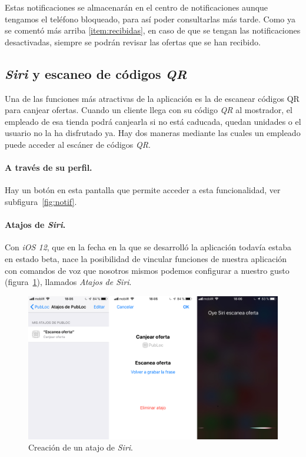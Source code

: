 Estas notificaciones se almacenarán en el centro de notificaciones aunque tengamos el teléfono bloqueado, para así poder consultarlas más tarde. Como ya se comentó más arriba \ref{item:recibidas}, en caso de que se tengan las notificaciones desactivadas, siempre se podrán revisar las ofertas que se han recibido.



\subsection{\textit{Siri} y escaneo de códigos \textit{QR}} \label{qr}
Una de las funciones más atractivas de la aplicación es la de escanear códigos QR para canjear ofertas. Cuando un cliente llega con su código \textit{QR} al mostrador, el empleado de esa tienda podrá canjearla si no está caducada, quedan unidades o el usuario no la ha disfrutado ya. Hay dos maneras mediante las cuales un empleado puede acceder al escáner de códigos \textit{QR}.

\paragraph{A través de su perfil.} Hay un botón en esta pantalla que permite acceder a esta funcionalidad, ver subfigura~\ref{fig:notif}.

\paragraph{Atajos de \textit{Siri}.} Con \textit{iOS 12}, que en la fecha en la que se desarrolló la aplicación todavía estaba en estado beta, nace la posibilidad de vincular funciones de nuestra aplicación con comandos de voz que nosotros mismos podemos configurar a nuestro gusto (figura~\ref{fig:siri}), llamados \textit{Atajos de Siri}.

\begin{figure}[tbp]
\centering
\includegraphics[scale=0.2]{figures/siri.png}
\caption{Creación de un atajo de \textit{Siri}.\label{fig:siri}}
\end{figure}

